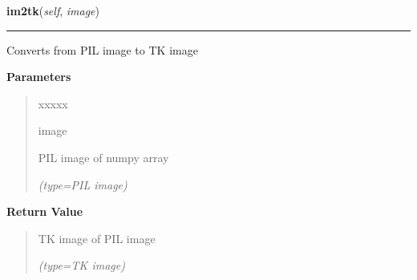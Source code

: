 \hspace{.8\funcindent}\begin{boxedminipage}{\funcwidth}

    \raggedright \textbf{im2tk}(\textit{self}, \textit{image})

    \vspace{-1.5ex}

    \rule{\textwidth}{0.5\fboxrule}
\setlength{\parskip}{2ex}
    Converts from PIL image to TK image

\setlength{\parskip}{1ex}
      \textbf{Parameters}
      \vspace{-1ex}

      \begin{quote}
        \begin{Ventry}{xxxxx}

          \item[image]

          PIL image of numpy array

            {\it (type=PIL image)}

        \end{Ventry}

      \end{quote}

      \textbf{Return Value}
    \vspace{-1ex}

      \begin{quote}
      TK image of PIL image

      {\it (type=TK image)}

      \end{quote}

    \end{boxedminipage}

    \label{client_gui:GuiClass:mouse_click}

    \vspace{0.5ex}

